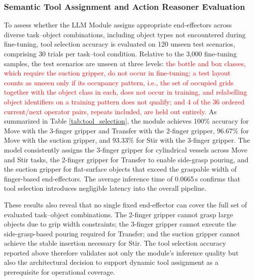 \documentclass{ieeeaccess}
\newif\ifhighlight
\newcommand{\rev}[1]{\ifhighlight\hl{#1}\else#1\fi}
\newcommand{\nd}[1]{\textcolor{red}{#1}}
\begin{document}
\subsubsection{Semantic Tool Assignment and Action Reasoner Evaluation}\label{sec:4.4.1}
To assess whether the LLM Module assigns appropriate end-effectors across diverse task--object combinations, including object types not encountered during fine-tuning, tool selection accuracy is evaluated on 120 unseen test scenarios, comprising 30 trials per task--tool condition.
\rev{Relative to the 3,000 fine-tuning samples, the test scenarios are unseen at three levels: \nd{the bottle and box classes, which require the suction gripper, do not occur in fine-tuning; a test layout counts as unseen only if its occupancy pattern, i.e., the set of occupied grids together with the object class in each, does not occur in training, and relabelling object identifiers on a training pattern does not qualify; and 4 of the 36 ordered current/next operator pairs, repeats included, are held out entirely}.} As summarized in Table \ref{tab:tool_selection}, the module achieves 100\% accuracy for Move with the 3-finger gripper and Transfer with the 2-finger gripper, 96.67\% for Move with the suction gripper, and 93.33\% for Stir with the 3-finger gripper. The model consistently assigns the 3-finger gripper for cylindrical vessels across Move and Stir tasks, the 2-finger gripper for Transfer to enable side-grasp pouring, and the suction gripper for flat-surface objects that exceed the graspable width of finger-based end-effectors. The average inference time of 0.0665\,s confirms that tool selection introduces negligible latency into the overall pipeline.

These results also reveal that no single fixed end-effector can cover the full set of evaluated task--object combinations. The 2-finger gripper cannot grasp large objects due to grip width constraints; the 3-finger gripper cannot execute the side-grasp-based pouring required for Transfer; and the suction gripper cannot achieve the stable insertion necessary for Stir. The tool selection accuracy reported above therefore validates not only the module's inference quality but also the architectural decision to support dynamic tool assignment as a prerequisite for operational coverage.
\end{document}
